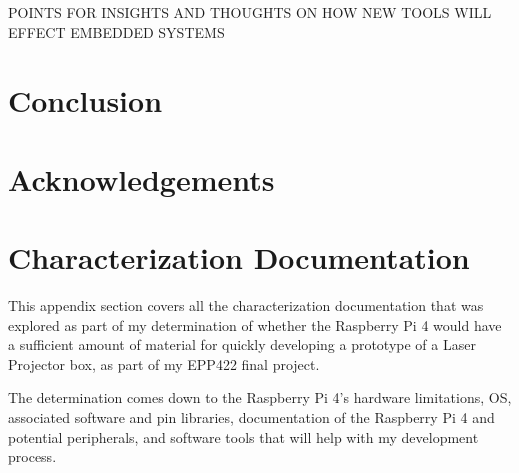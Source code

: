 \documentclass[journal]{IEEEtran}
\begin{document}
    POINTS FOR INSIGHTS AND THOUGHTS ON HOW NEW TOOLS WILL EFFECT EMBEDDED SYSTEMS


    \section{Conclusion}


    \nocite{*}
    \newpage

    
    

    \newpage
    \section{Acknowledgements}

    \appendices
    \section{Characterization Documentation}
    This appendix section covers all the characterization documentation that was explored as part of my determination of whether the Raspberry Pi 4 would have a sufficient amount of material for quickly developing a prototype of a
    Laser Projector box, as part of my EPP422 final project.
    
    The determination comes down to the Raspberry Pi 4's hardware limitations, OS, associated software and pin libraries, documentation of the Raspberry Pi 4 and potential peripherals, and software tools that 
    will help with my development process.
\end{document}
